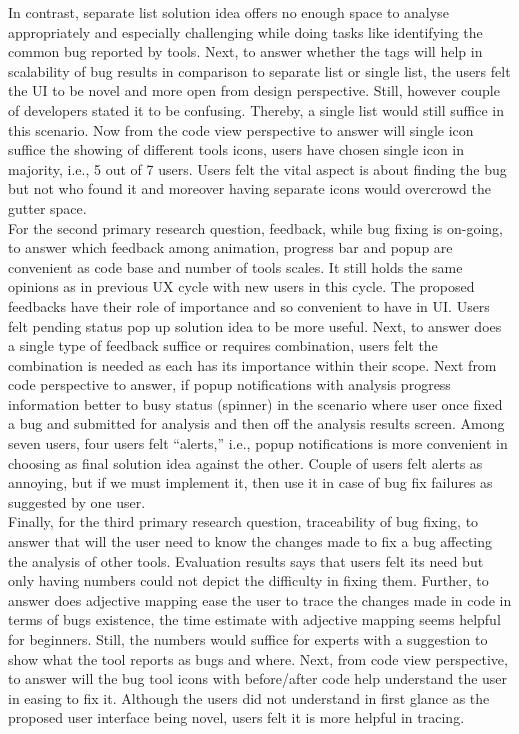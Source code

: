 In contrast, separate list solution idea offers no enough space to analyse appropriately and especially challenging while doing tasks like identifying the common bug reported by tools. Next, to answer whether the tags will help in scalability of bug results in comparison to separate list or single list, the users felt the UI to be novel and more open from design perspective. Still, however couple of developers stated it to be confusing. Thereby, a single list would still suffice in this scenario. Now from the code view perspective to answer will single icon suffice the showing of different tools icons, users have chosen single icon in majority, i.e., 5 out of 7 users. Users felt the vital aspect is about finding the bug but not who found it and moreover having separate icons would overcrowd the gutter space. \\

For the second primary research question, feedback, while bug fixing is on-going, to answer which feedback among animation, progress bar and popup are convenient as code base and number of tools scales. It still holds the same opinions as in previous UX cycle with new users in this cycle. The proposed feedbacks have their role of importance and so convenient to have in UI. Users felt pending status pop up solution idea to be more useful. Next, to answer does a single type of feedback suffice or requires combination, users felt the combination is needed as each has its importance within their scope.  Next from code perspective to answer, if popup notifications with analysis progress information better to busy status (spinner) in the scenario where user once fixed a bug and submitted for analysis and then off the analysis results screen. Among seven users, four users felt “alerts,” i.e., popup notifications is more convenient in choosing as final solution idea against the other. Couple of users felt alerts as annoying, but if we must implement it, then use it in case of bug fix failures as suggested by one user. \\

Finally, for the third primary research question, traceability of bug fixing, to answer that will the user need to know the changes made to fix a bug affecting the analysis of other tools. Evaluation results says that users felt its need but only having numbers could not depict the difficulty in fixing them. Further, to answer does adjective mapping ease the user to trace the changes made in code in terms of bugs existence, the time estimate with adjective mapping seems helpful for beginners. Still, the numbers would suffice for experts with a suggestion to show what the tool reports as bugs and where. Next, from code view perspective, to answer will the bug tool icons with before/after code help understand the user in easing to fix it. Although the users did not understand in first glance as the proposed user interface being novel, users felt it is more helpful in tracing. \\


